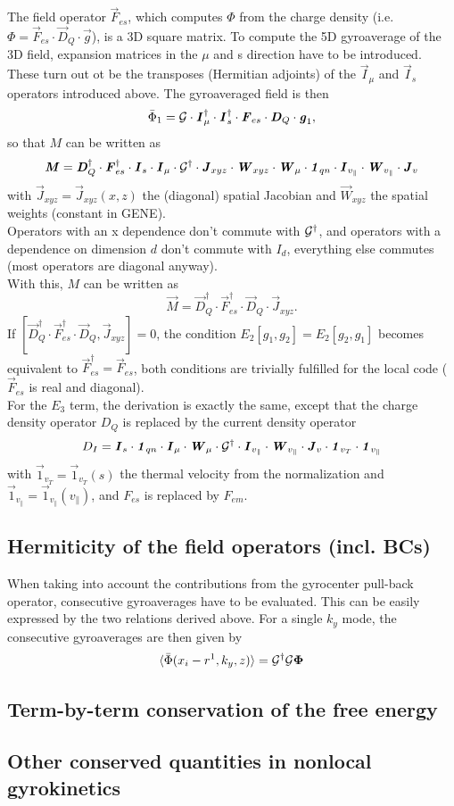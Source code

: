 \documentclass[12pt]{article}
\begin{document}
The field operator $\vec F_{es}$, which computes $\Phi$ from the charge density (i.e. $\Phi=\vec F_{es}\cdot \vec D_Q \cdot \vec g$),  is a 3D square matrix. 
To compute the 5D gyroaverage of the 3D field, expansion matrices in the $\mu$ and s direction 
have to be introduced. These turn out ot be the transposes (Hermitian adjoints) of the $\vec I_{\mu}$ 
and $\vec I_{s}$ operators introduced above. The gyroaveraged field is then
$$\bar \Phi_1=\mathcal{G}\cdot \textbf{\textit{I}}_{\mu}^\dag \cdot\textbf{\textit{I}}_{s}^\dag\cdot\textbf{\textit{F}}_{es}\cdot \textbf{\textit{D}}_Q \cdot \textbf{\textit{g}}_1,$$
so that $M$ can be written as
$$\textbf{\textit{M}}=\textbf{\textit{D}}_Q^\dag\cdot\textbf{\textit{F}}_{es}^\dag\cdot\textbf{\textit{I}}_{s} \cdot \textbf{\textit{I}}_{\mu} \cdot\mathcal{G}^\dag \cdot \textbf{\textit{J}}_{xyz}\cdot \textbf{\textit{W}}_{xyz}\cdot \textbf{\textit{W}}_\mu  \cdot\textbf{\textit{1}}_{qn}\cdot \textbf{\textit{I}}_{v_\parallel}\cdot \textbf{\textit{W}}_{v_\parallel}\cdot \textbf{\textit{J}}_v$$
with $\vec J_{xyz}=\vec J_{xyz}(x,z)$ the (diagonal) spatial Jacobian and $\vec W_{xyz}$ the spatial 
weights (constant in GENE).\\
Operators with an x dependence don't commute with $\mathcal{G}^\dag$, and operators with a dependence 
on dimension $d$ don't commute with $I_d$, everything else commutes (most operators are diagonal anyway).\\
With this, $M$ can be written as
$$\vec M= \vec D_Q^\dag\cdot\vec F_{es}^\dag\cdot\vec D_Q\cdot\vec J_{xyz}.$$
If $[\vec D_Q^\dag\cdot\vec F_{es}^\dag\cdot\vec D_Q,\vec J_{xyz}]=0$, the condition $E_2[g_1,g_2]=E_2[g_2,g_1]$ 
becomes equivalent to $\vec F_{es}^\dag=\vec F_{es}$, both conditions are trivially fulfilled for the local 
code ($\vec F_{es}$ is real and diagonal).\\
For the $E_3$ term, the derivation is exactly the same, except that the charge density operator $D_Q$ is replaced by the
current density operator 
$$D_I=\textbf{\textit{I}}_s \cdot\textbf{\textit{1}}_{qn}\cdot \textbf{\textit{I}}_\mu \cdot \textbf{\textit{W}}_\mu \cdot\mathcal{G}^\dag\cdot \textbf{\textit{I}}_{v_\parallel}\cdot \textbf{\textit{W}}_{v_\parallel} \cdot \textbf{\textit{J}}_v \cdot \textbf{\textit{1}}_{v_T}\cdot \textbf{\textit{1}}_{v_\parallel}$$
with $\vec 1_{v_T}=\vec 1_{v_T}(s)$ the thermal velocity from the normalization and $\vec 1_{v_\parallel}=\vec 1_{v_\parallel}(v_\parallel)$,
and $F_{es}$ is replaced by $F_{em}$.

\subsection{Hermiticity of the field operators (incl. BCs)}
When taking into account the contributions from the gyrocenter pull-back 
operator, consecutive gyroaverages have to be evaluated. This can be easily
expressed by the two relations derived above. For a single $k_y$ mode,
the consecutive gyroaverages are then given by
\begin{align}
\langle\bar{\Phi}(x_i-r^1,k_y,z)\rangle=\mathcal{G}^\dag\mathcal{G}\mathbf\Phi
\end{align}


\subsection{Term-by-term conservation of the free energy}



\subsection{Other conserved quantities in nonlocal gyrokinetics}
\end{document}
